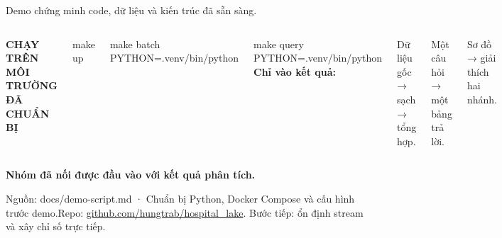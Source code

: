 \documentclass[aspectratio=169,11pt]{beamer}
\renewcommand{\small}{\fontsize{18}{24}\selectfont}
\renewcommand{\footnotesize}{\fontsize{13}{17}\selectfont}
\newcommand{\labeltext}[1]{{\fontsize{13}{17}\selectfont\bfseries\color{teal}#1}}
\newcommand{\source}[1]{\vfill{\footnotesize\color{muted}Nguồn: #1\par}}
\newcommand{\command}[1]{{\ttfamily\fontsize{19}{25}\selectfont\color{teal}#1}}
\begin{document}
\begin{frame}{Demo chứng minh code, dữ liệu và kiến trúc đã sẵn sàng.}
  \begin{columns}[T,onlytextwidth]
      \labeltext{CHẠY TRÊN MÔI TRƯỜNG ĐÃ CHUẨN BỊ}\par\vspace{6mm}
      \command{make up}\par\vspace{6mm}
      \command{make batch PYTHON=.venv/bin/python}\par\vspace{6mm}
      \command{make query PYTHON=.venv/bin/python}
      \textbf{Chỉ vào kết quả:}\par\vspace{5mm}
      {\small Dữ liệu gốc → sạch → tổng hợp.\par\vspace{4mm}
      Một câu hỏi → một bảng trả lời.\par\vspace{4mm}
      Sơ đồ → giải thích hai nhánh.}
  \end{columns}
  \vspace{9mm}
  {\fontsize{24}{31}\selectfont\bfseries Nhóm đã nối được đầu vào với kết quả phân tích.}\par
  \source{docs/demo-script.md · Chuẩn bị Python, Docker Compose và cấu hình trước demo.\newline Repo: \href{https://github.com/hungtrab/hospital_lake}{github.com/hungtrab/hospital\_lake}. Bước tiếp: ổn định stream và xây chỉ số trực tiếp.}
\end{frame}
\end{document}
